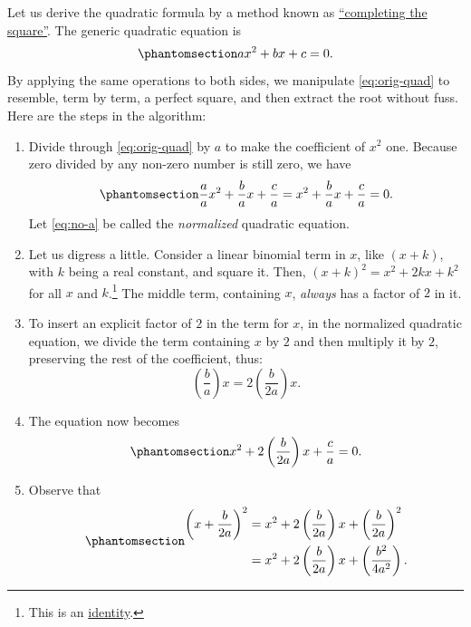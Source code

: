 \documentclass[
  a4paper,
]{article}
\begin{document}
Let us derive the quadratic formula by a method known as
\href{https://en.wikipedia.org/wiki/Completing_the_square}{``completing
the square''}. The generic quadratic equation is
\begin{equation}\phantomsection\label{eq:orig-quad}{
ax^2 + bx + c = 0.
}\end{equation} By applying the same operations to both sides, we
manipulate \cref{eq:orig-quad} to resemble, term by term, a perfect
square, and then extract the root without fuss. Here are the steps in
the algorithm:

\begin{enumerate}
\item
  Divide through \cref{eq:orig-quad} by \(a\) to make the coefficient of
  \(x^2\) one. Because zero divided by any non-zero number is still
  zero, we have \begin{equation}\phantomsection\label{eq:no-a}{
  \frac{a}{a}x^2 + \frac{b}{a}x + \frac{c}{a} = x^2 + \frac{b}{a}x + \frac{c}{a} = 0.
  }\end{equation} Let \cref{eq:no-a} be called the \emph{normalized}
  quadratic equation.
\item
  Let us digress a little. Consider a linear binomial term in \(x\),
  like \((x + k)\), with \(k\) being a real constant, and square it.
  Then, \((x + k)^2 = x^2 + 2kx + k^2\) for all \(x\) and
  \(k\).\footnote{This is an \hyperref[identities]{identity}.} The
  middle term, containing \(x\), \emph{always} has a factor of \(2\) in
  it.
\item
  To insert an explicit factor of \(2\) in the term for \(x\), in the
  normalized quadratic equation, we divide the term containing \(x\) by
  \(2\) and then multiply it by \(2\), preserving the rest of the
  coefficient, thus: \[
  \left(\frac{b}{a}\right)x = 2\left(\frac{b}{2a}\right)x.
  \]
\item
  The equation now becomes
  \begin{equation}\phantomsection\label{eq:normalized-one}{
  x^2 + 2\left(\frac{b}{2a}\right)x + \frac{c}{a} = 0.
  }\end{equation}
\item
  Observe that \begin{equation}\phantomsection\label{eq:extra-term}{
  \begin{aligned}
  \left(x + \frac{b}{2a}\right)^2 &= x^2 + 2\left(\frac{b}{2a}\right)x + \left(\frac{b}{2a}\right)^2\\
  &= x^2 + 2\left(\frac{b}{2a}\right)x + \left(\frac{b^2}{4a^2}\right).
  \end{aligned}
}
\end{equation}
\end{enumerate}
\end{document}
